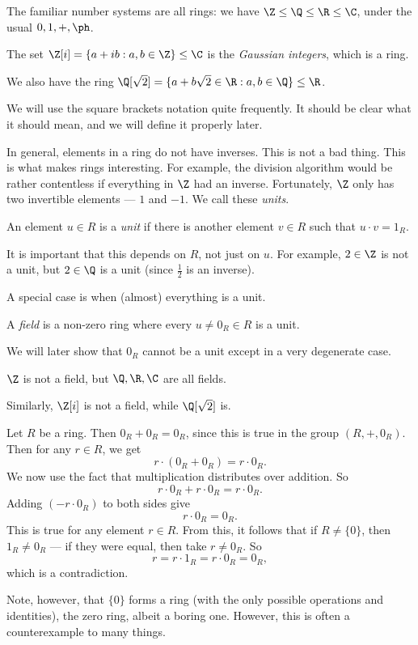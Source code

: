 \documentclass[a4paper]{article}
\begin{document}
\begin{eg}
  The familiar number systems are all rings: we have $\Z \leq \Q \leq \R \leq \C$, under the usual $0, 1, +, \ph$.
\end{eg}

\begin{eg}
  The set $\Z[i] = \{a + ib: a, b \in \Z\} \leq \C$ is the \emph{Gaussian integers}, which is a ring.

  We also have the ring $\Q[\sqrt{2}] = \{a + b \sqrt{2} \in \R: a, b \in \Q\} \leq \R$.
\end{eg}
We will use the square brackets notation quite frequently. It should be clear what it should mean, and we will define it properly later.

In general, elements in a ring do not have inverses. This is not a bad thing. This is what makes rings interesting. For example, the division algorithm would be rather contentless if everything in $\Z$ had an inverse. Fortunately, $\Z$ only has two invertible elements --- $1$ and $-1$. We call these \emph{units}.

\begin{defi}[Unit]
  An element $u \in R$ is a \emph{unit} if there is another element $v \in R$ such that $u \cdot v = 1_R$.
\end{defi}
It is important that this depends on $R$, not just on $u$. For example, $2 \in \Z$ is not a unit, but $2 \in \Q$ is a unit (since $\frac{1}{2}$ is an inverse).

A special case is when (almost) everything is a unit.
\begin{defi}[Field]
  A \emph{field} is a non-zero ring where every $u \not= 0_R \in R$ is a unit.
\end{defi}
We will later show that $0_R$ cannot be a unit except in a very degenerate case.

\begin{eg}
  $\Z$ is not a field, but $\Q, \R, \C$ are all fields.

  Similarly, $\Z[i]$ is not a field, while $\Q[\sqrt{2}]$ is.
\end{eg}

\begin{eg}
  Let $R$ be a ring. Then $0_R + 0_R = 0_R$, since this is true in the group $(R, +, 0_R)$. Then for any $r \in R$, we get
  \[
    r\cdot (0_R + 0_R) = r\cdot 0_R.
  \]
  We now use the fact that multiplication distributes over addition. So
  \[
    r \cdot 0_R + r \cdot 0_R = r \cdot 0_R.
  \]
  Adding $(-r \cdot 0_R)$ to both sides give
  \[
    r \cdot 0_R = 0_R.
  \]
  This is true for any element $r \in R$. From this, it follows that if $R \not= \{0\}$, then $1_R \not= 0_R$ --- if they were equal, then take $r \not= 0_R$. So
  \[
    r = r \cdot 1_R = r \cdot 0_R = 0_R,
  \]
  which is a contradiction.
\end{eg}
Note, however, that $\{0\}$ forms a ring (with the only possible operations and identities), the zero ring, albeit a boring one. However, this is often a counterexample to many things.
\end{document}
